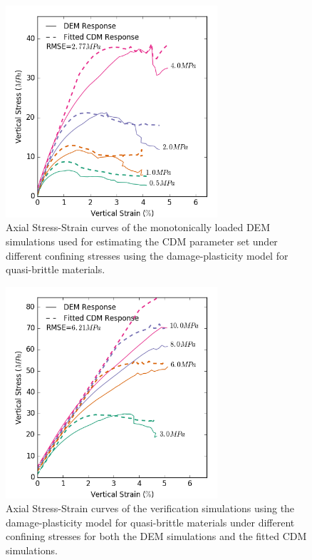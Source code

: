 \begin{figure}[!htb]
\begin{center}
\includegraphics[width=0.7\textwidth]{figures/Chapter5/ConcreteFittedCurves}
\caption{{\label{fig:concretefitted} Axial Stress-Strain curves of the monotonically loaded DEM simulations  used for estimating the CDM parameter set under different confining stresses using the damage-plasticity model for quasi-brittle materials.%
}}
\end{center}
\end{figure}


\begin{figure}[!htb]
\begin{center}
\includegraphics[width=0.7\textwidth]{figures/Chapter5/ConcreteVerificationCurves}
\caption{{\label{fig:concreteverify} Axial Stress-Strain curves of the verification simulations using the damage-plasticity model for quasi-brittle materials under different confining stresses for both the DEM simulations and the fitted CDM simulations.%
}}
\end{center}
\end{figure}

